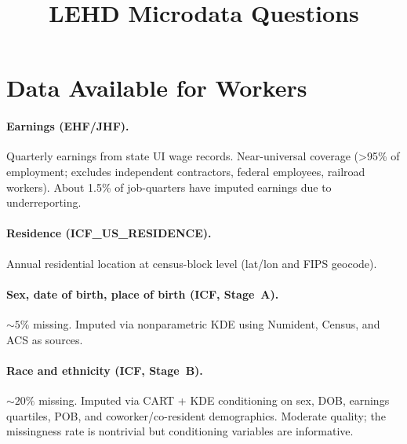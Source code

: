 \documentclass[11pt]{article}
\title{LEHD Microdata Questions}
\date{}
\begin{document}
\maketitle

\section*{Data Available for Workers}

\paragraph{Earnings (EHF/JHF).}
Quarterly earnings from state UI wage records. Near-universal coverage ({>}95\% of employment; excludes independent contractors, federal employees, railroad workers). About 1.5\% of job-quarters have imputed earnings due to underreporting.

\paragraph{Residence (ICF\_US\_RESIDENCE).}
Annual residential location at census-block level (lat/lon and FIPS geocode).

\paragraph{Sex, date of birth, place of birth (ICF, Stage~A).}
${\sim}5\%$ missing. Imputed via nonparametric KDE using Numident, Census, and ACS as sources.

\paragraph{Race and ethnicity (ICF, Stage~B).}
${\sim}20\%$ missing. Imputed via CART + KDE conditioning on sex, DOB, earnings quartiles, POB, and coworker/co-resident demographics. Moderate quality; the missingness rate is nontrivial but conditioning variables are informative.
\end{document}

